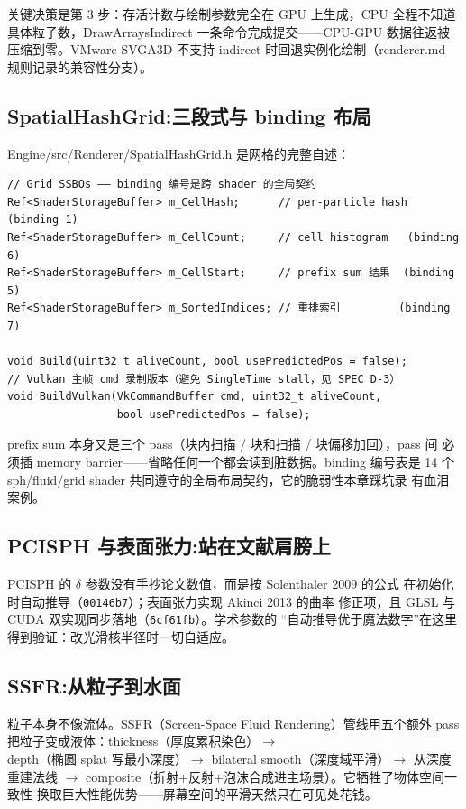 关键决策是第 3 步：存活计数与绘制参数完全在 GPU 上生成，CPU 全程不知道
具体粒子数，DrawArraysIndirect 一条命令完成提交——CPU-GPU 数据往返被
压缩到零。VMware SVGA3D 不支持 indirect 时回退实例化绘制（renderer.md
规则记录的兼容性分支）。

\subsection{SpatialHashGrid:三段式与 binding 布局}

Engine/src/Renderer/SpatialHashGrid.h 是网格的完整自述：

\begin{lstlisting}
// Grid SSBOs —— binding 编号是跨 shader 的全局契约
Ref<ShaderStorageBuffer> m_CellHash;      // per-particle hash (binding 1)
Ref<ShaderStorageBuffer> m_CellCount;     // cell histogram   (binding 6)
Ref<ShaderStorageBuffer> m_CellStart;     // prefix sum 结果  (binding 5)
Ref<ShaderStorageBuffer> m_SortedIndices; // 重排索引         (binding 7)

void Build(uint32_t aliveCount, bool usePredictedPos = false);
// Vulkan 主帧 cmd 录制版本（避免 SingleTime stall，见 SPEC D-3）
void BuildVulkan(VkCommandBuffer cmd, uint32_t aliveCount,
                 bool usePredictedPos = false);
\end{lstlisting}

prefix sum 本身又是三个 pass（块内扫描 / 块和扫描 / 块偏移加回），pass 间
必须插 memory barrier——省略任何一个都会读到脏数据。binding 编号表是
14 个 sph/fluid/grid shader 共同遵守的全局布局契约，它的脆弱性本章踩坑录
有血泪案例。

\subsection{PCISPH 与表面张力:站在文献肩膀上}

PCISPH 的 $\delta$ 参数没有手抄论文数值，而是按 Solenthaler 2009 的公式
在初始化时自动推导（\texttt{00146b7}）；表面张力实现 Akinci 2013 的曲率
修正项，且 GLSL 与 CUDA 双实现同步落地（\texttt{6cf61fb}）。学术参数的
``自动推导优于魔法数字''在这里得到验证：改光滑核半径时一切自适应。

\subsection{SSFR:从粒子到水面}

粒子本身不像流体。SSFR（Screen-Space Fluid Rendering）管线用五个额外
pass 把粒子变成液体：thickness（厚度累积染色）$\to$ depth（椭圆 splat
写最小深度）$\to$ bilateral smooth（深度域平滑）$\to$ 从深度重建法线
$\to$ composite（折射+反射+泡沫合成进主场景）。它牺牲了物体空间一致性
换取巨大性能优势——屏幕空间的平滑天然只在可见处花钱。

